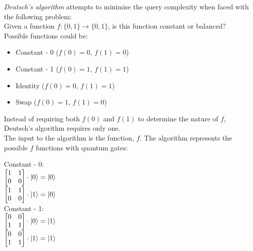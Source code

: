 \begin{definition}
    \emph{Deutsch's algorithm} attempts to minimise the query complexity when faced with the following problem:\\

    Given a function $f: \{0, 1\} \rightarrow \{0, 1\}$, is this function constant or balanced?\\
    
    Possible functions could be:
    \begin{itemize}
        \item Constant - 0 ($f(0)=0$, $f(1)=0$)
        \item Constant - 1 ($f(0)=1$, $f(1)=1$)
        \item Identity ($f(0)=0$, $f(1)=1$)
        \item Swap ($f(0)=1$, $f(1)=0$)
    \end{itemize}

    Instead of requiring both $f(0)$ and $f(1)$ to determine the nature of $f$, Deutsch's algorithm requires only one.\\
    The input to the algorithm is the function, $f$. The algorithm represents the possible $f$ functions with quantum gates:

    Constant - 0:\\
    $\begin{bmatrix}
        1 & 1\\
        0 & 0
    \end{bmatrix} \cdot \lvert0\rangle = \lvert0\rangle$\\

    $\begin{bmatrix}
        1 & 1\\
        0 & 0
    \end{bmatrix} \cdot \lvert1\rangle = \lvert0\rangle$\\


    Constant - 1:\\
    $\begin{bmatrix}
        0 & 0\\
        1 & 1
    \end{bmatrix} \cdot \lvert0\rangle = \lvert1\rangle$\\

    $\begin{bmatrix}
        0 & 0\\
        1 & 1
    \end{bmatrix} \cdot \lvert1\rangle = \lvert1\rangle$\\



\end{definition}
